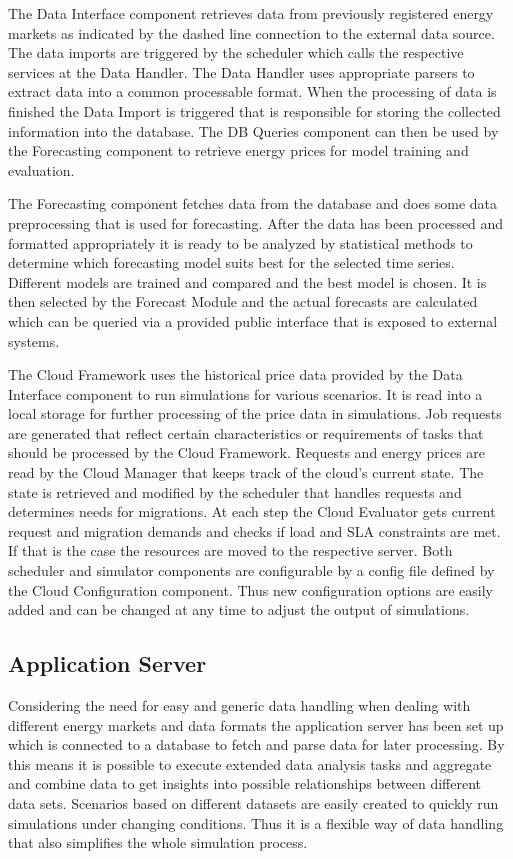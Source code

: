 The Data Interface component retrieves data from previously registered energy markets as indicated by the dashed line connection to the external data source. The data imports are triggered by the scheduler which calls the respective services at the Data Handler. The Data Handler uses appropriate parsers to extract data into a common processable format. When the processing of data is finished the Data Import is triggered that is responsible for storing the collected information into the database. The DB Queries component can then be used by the Forecasting component to retrieve energy prices for model training and evaluation. 

The Forecasting component fetches data from the database and does some data preprocessing that is used for forecasting. After the data has been processed and formatted appropriately it is ready to be analyzed by statistical methods to determine which forecasting model suits best for the selected time series. Different models are trained and compared and the best model is chosen. It is then selected by the Forecast Module and the actual forecasts are calculated which can be queried via a provided public interface that is exposed to external systems. 

The Cloud Framework uses the historical price data provided by the Data Interface component to run simulations for various scenarios. It is read into a local storage for further processing of the price data in simulations. Job requests are generated that reflect certain characteristics or requirements of tasks that should be processed by the Cloud Framework. Requests and energy prices are read by the Cloud Manager that keeps track of the cloud's current state. The state is retrieved and modified by the scheduler that handles requests and determines needs for migrations. At each step the Cloud Evaluator gets current request and migration demands and checks if load and SLA constraints are met. If that is the case the resources are moved to the respective server. Both scheduler and simulator components are configurable by a config file defined by the Cloud Configuration component. Thus new configuration options are easily added and can be changed at any time to adjust the output of simulations. 


\subsection{Application Server}

Considering the need for easy and generic data handling when dealing with different energy markets and data formats the application server has been set up which is connected to a database to fetch and parse data for later processing. By this means it is possible to execute extended data analysis tasks and aggregate and combine data to get insights into possible relationships between different data sets. Scenarios based on different datasets are easily created to quickly run simulations under changing conditions. Thus it is a flexible way of data handling that also simplifies the whole simulation process. 

